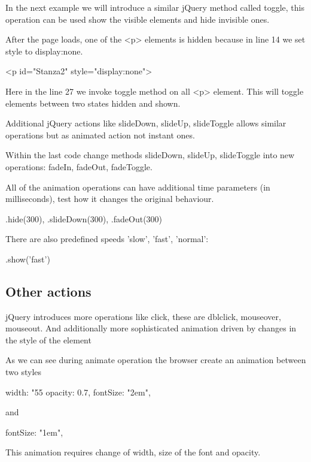 In the next example we will introduce a similar jQuery method called toggle, this operation can be used show the visible elements and hide invisible ones.


\begin{explain}
After the page loads, one of the <p> elements is hidden because in line 14  we set style to display:none.
\begin{html}
<p id="Stanza2" style="display:none">
\end{html}
Here in the line 27 we invoke toggle method on all <p> element. This will toggle elements between two states hidden and shown.
\end{explain}

Additional jQuery actions like slideDown, slideUp, slideToggle allows similar operations but as animated action not instant ones.


\begin{extercises}
Within the last code change methods slideDown, slideUp, slideToggle into new operations: fadeIn, fadeOut, fadeToggle.
\end{extercises}

\begin{extercises}
All of the animation operations can have additional time parameters (in milliseconds), test how it changes the original behaviour.
\begin{js}
.hide(300),
.slideDown(300),
.fadeOut(300)
\end{js}


There are also predefined speeds 'slow', 'fast', 'normal':
\begin{js}
.show('fast')
\end{js}
\end{extercises}

\subsection{Other actions}
jQuery introduces more operations like click, these are dblclick, mouseover, mouseout. And additionally more sophisticated animation driven by changes in the style of the element


\begin{explain}
  As we can see during animate operation the browser create an animation between two styles
  \begin{js}
    width: "55%
    opacity: 0.7,
    fontSize: "2em",
  \end{js}
   and
  \begin{js}
    fontSize: "1em",
  \end{js}

This animation requires change of width, size of the font and opacity.
\end{explain} 